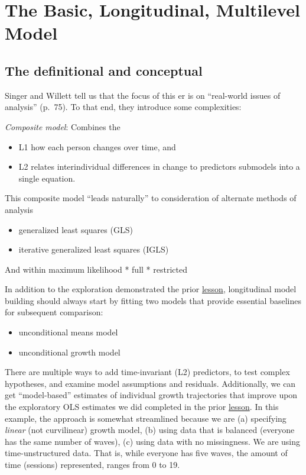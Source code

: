 \documentclass[
  11pt,
]{book}
\providecommand{\tightlist}{%
  \setlength{\itemsep}{0pt}\setlength{\parskip}{0pt}}
\begin{document}
\hypertarget{the-basic-longitudinal-multilevel-model}{%
\section{The Basic, Longitudinal, Multilevel Model}\label{the-basic-longitudinal-multilevel-model}}

\hypertarget{the-definitional-and-conceptual}{%
\subsection{The definitional and conceptual}\label{the-definitional-and-conceptual}}

Singer and Willett \citeyearpar{singer_applied_2003} tell us that the focus of this er is on ``real-world issues of analysis'' (p.~75). To that end, they introduce some complexities:

\emph{Composite model}: Combines the

\begin{itemize}
\tightlist
\item
  L1 how each person changes over time, and
\item
  L2 relates interindividual differences in change to predictors submodels into a single equation.
\end{itemize}

This composite model ``leads naturally'' to consideration of alternate methods of analysis

\begin{itemize}
\tightlist
\item
  generalized least squares (GLS)
\item
  iterative generalized least squares (IGLS)
\end{itemize}

And within maximum likelihood
* full
* restricted

In addition to the exploration demonstrated the prior \protect\hyperlink{MLMexplore}{lesson}, longitudinal model building should always start by fitting two models that provide essential baselines for subsequent comparison:

\begin{itemize}
\tightlist
\item
  unconditional means model
\item
  unconditional growth model
\end{itemize}

There are multiple ways to add time-invariant (L2) predictors, to test complex hypotheses, and examine model assumptions and residuals. Additionally, we can get ``model-based'' estimates of individual growth trajectories that improve upon the exploratory OLS estimates we did completed in the prior \protect\hyperlink{MLMexplore}{lesson}. In this example, the approach is somewhat streamlined because we are (a) specifying \emph{linear} (not curvilinear) growth model, (b) using data that is balanced (everyone has the same number of waves), (c) using data with no missingness. We are using time-unstructured data. That is, while everyone has five waves, the amount of time (sessions) represented, ranges from 0 to 19.
\end{document}

